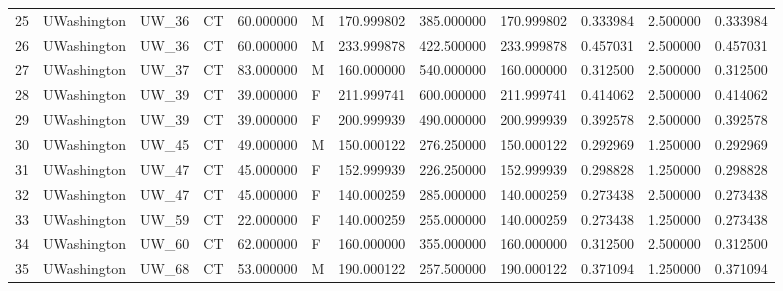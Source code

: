\begin{tabular}{llllrlrrrrrr}
25     &     UWashington &        UW\_36 &                 CT &  60.000000 &        M &       170.999802 &    385.000000 &  170.999802 &               0.333984 &            2.500000 &          0.333984 \\
26     &     UWashington &        UW\_36 &                 CT &  60.000000 &        M &       233.999878 &    422.500000 &  233.999878 &               0.457031 &            2.500000 &          0.457031 \\
27     &     UWashington &        UW\_37 &                 CT &  83.000000 &        M &       160.000000 &    540.000000 &  160.000000 &               0.312500 &            2.500000 &          0.312500 \\
28     &     UWashington &        UW\_39 &                 CT &  39.000000 &        F &       211.999741 &    600.000000 &  211.999741 &               0.414062 &            2.500000 &          0.414062 \\
29     &     UWashington &        UW\_39 &                 CT &  39.000000 &        F &       200.999939 &    490.000000 &  200.999939 &               0.392578 &            2.500000 &          0.392578 \\
30     &     UWashington &        UW\_45 &                 CT &  49.000000 &        M &       150.000122 &    276.250000 &  150.000122 &               0.292969 &            1.250000 &          0.292969 \\
31     &     UWashington &        UW\_47 &                 CT &  45.000000 &        F &       152.999939 &    226.250000 &  152.999939 &               0.298828 &            1.250000 &          0.298828 \\
32     &     UWashington &        UW\_47 &                 CT &  45.000000 &        F &       140.000259 &    285.000000 &  140.000259 &               0.273438 &            2.500000 &          0.273438 \\
33     &     UWashington &        UW\_59 &                 CT &  22.000000 &        F &       140.000259 &    255.000000 &  140.000259 &               0.273438 &            1.250000 &          0.273438 \\
34     &     UWashington &        UW\_60 &                 CT &  62.000000 &        F &       160.000000 &    355.000000 &  160.000000 &               0.312500 &            2.500000 &          0.312500 \\
35     &     UWashington &        UW\_68 &                 CT &  53.000000 &        M &       190.000122 &    257.500000 &  190.000122 &               0.371094 &            1.250000 &          0.371094 \\

\end{tabular}
